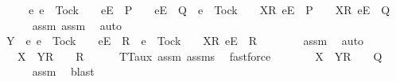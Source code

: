 \begin{isabellebody}
\ \ \ \ {\isasymsubseteq}\ {\isacharbraceleft}e{\isachardot}\ e\ {\isasymnoteq}\ Tock\ {\isasymand}\ {\isasymrho}\ {\isacharat}\ {\isacharbrackleft}{\isacharbrackleft}e{\isacharbrackright}\isactrlsub E{\isacharbrackright}\ {\isasymin}\ P\ {\isasymand}\ {\isasymrho}\ {\isacharat}\ {\isacharbrackleft}{\isacharbrackleft}e{\isacharbrackright}\isactrlsub E{\isacharbrackright}\ {\isasymin}\ Q\ {\isasymor}\ e\ {\isacharequal}\ Tock\ {\isasymand}\ {\isasymrho}\ {\isacharat}\ {\isacharbrackleft}{\isacharbrackleft}X{\isacharbrackright}\isactrlsub R{\isacharcomma}\ {\isacharbrackleft}e{\isacharbrackright}\isactrlsub E{\isacharbrackright}\ {\isasymin}\ P\ {\isasymand}\ {\isasymrho}\ {\isacharat}\ {\isacharbrackleft}{\isacharbrackleft}X{\isacharbrackright}\isactrlsub R{\isacharcomma}\ {\isacharbrackleft}e{\isacharbrackright}\isactrlsub E{\isacharbrackright}\ {\isasymin}\ Q{\isacharbraceright}{\isachardoublequoteclose}\isanewline
\ \ \ \ \isamarkupfalse%
\ assm{}\ assm{}\ \isamarkupfalse%
\ auto\isanewline
\ \ \isamarkupfalse%
\ \isamarkupfalse%
\ {\isachardoublequoteopen}Y\ {\isasyminter}\ {\isacharbraceleft}e{\isachardot}\ e\ {\isasymnoteq}\ Tock\ {\isasymand}\ {\isasymrho}\ {\isacharat}\ {\isacharbrackleft}{\isacharbrackleft}e{\isacharbrackright}\isactrlsub E{\isacharbrackright}\ {\isasymin}\ R\ {\isasymor}\ e\ {\isacharequal}\ Tock\ {\isasymand}\ {\isasymrho}\ {\isacharat}\ {\isacharbrackleft}{\isacharbrackleft}X{\isacharbrackright}\isactrlsub R{\isacharcomma}\ {\isacharbrackleft}e{\isacharbrackright}\isactrlsub E{\isacharbrackright}\ {\isasymin}\ R{\isacharbraceright}\ {\isacharequal}\ {\isacharbraceleft}{\isacharbraceright}{\isachardoublequoteclose}\isanewline
\ \ \ \ \isamarkupfalse%
\ assm{}\ \isamarkupfalse%
\ auto\isanewline
\ \ \isamarkupfalse%
\ \isamarkupfalse%
\ {\isachardoublequoteopen}{\isasymrho}\ {\isacharat}\ {\isacharbrackleft}X\ {\isasymunion}\ Y{\isacharbrackright}\isactrlsub R\ {\isacharhash}\ {\isasymsigma}\ {\isasymin}\ R{\isachardoublequoteclose}\isanewline
\ \ \ \ \isamarkupfalse%
\ TT{}{\isacharunderscore}aux{}\ assm{}\ assms{\isacharparenleft}{}{\isacharparenright}\ \isamarkupfalse%
\ fastforce\isanewline
\ \ \isamarkupfalse%
\ \isamarkupfalse%
\ {\isachardoublequoteopen}{\isasymrho}\ {\isacharat}\ {\isacharbrackleft}X\ {\isasymunion}\ Y{\isacharbrackright}\isactrlsub R\ {\isacharhash}\ {\isasymsigma}\ {\isasymin}\ Q{\isachardoublequoteclose}\isanewline
\ \ \ \ \isamarkupfalse%
\ assm{}\ \isamarkupfalse%
\ blast\isanewline
{}\isamarkupfalse%
%
\endisatagproof
{\isafoldproof}%
%
\isadelimproof
\isanewline
%
\endisadelimproof
%
\isadelimtheory
\isanewline
%
\endisadelimtheory
%
\isatagtheory
{}\isamarkupfalse%
%
\endisatagtheory
{\isafoldtheory}%
%
\isadelimtheory
%
\endisadelimtheory
%
\end{isabellebody}%

